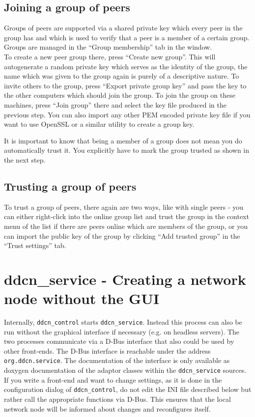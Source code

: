 \documentclass[a4paper,9pt]{scrartcl}
\begin{document}
\subsection{Joining a group of peers}

Groups of peers are supported via a shared private key which every peer in the group has and which is used to verify that a peer is a member of a certain group. \\
Groups are managed in the ``Group membership'' tab in the window. \\
To create a new peer group there, press ``Create new group''. This will autogenerate a random private key which serves as the identity of the group, the name which was given to the group again is purely of a descriptive nature. To invite others to the group, press ``Export private group key'' and pass the key to the other computers which should join the group. To join the group on these machines, press ``Join group'' there and select the key file produced in the previous step. You can also import any other PEM encoded private key file if you want to use OpenSSL or a similar utility to create a group key.\\
\smallskip

It is important to know that being a member of a group does not mean you do automatically trust it. You explicitly have to mark the group trusted as shown in the next step.

\subsection{Trusting a group of peers}

To trust a group of peers, there again are two ways, like with single peers - you can either right-click into the online group list and trust the group in the context menu of the list if there are peers online which are members of the group, or you can import the public key of the group by clicking ``Add trusted group'' in the ``Trust settings'' tab.

\section{ddcn\_service - Creating a network node without the GUI}

Internally, \texttt{ddcn\_control} starts \texttt{ddcn\_service}. Instead this process can also be run without the graphical interface if necessary (e.g. on headless servers). The two processes communicate via a D-Bus interface that also could be used by other front-ends. The D-Bus interface is reachable under the address \texttt{org.ddcn.service}. The documentation of the interface is only available as doxygen documentation of the adaptor classes within the \texttt{ddcn\_service} sources. If you write a front-end and want to change settings, as it is done in the configuration dialog of \texttt{ddcn\_control}, do not edit the INI file described below but rather call the appropriate functions via D-Bus. This ensures that the local network node will be informed about changes and reconfigures itself.
\end{document}
